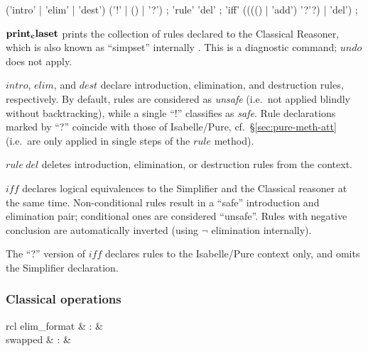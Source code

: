 \begin{rail}
  ('intro' | 'elim' | 'dest') ('!' | () | '?')
  ;
  'rule' 'del'
  ;
  'iff' (((() | 'add') '?'?) | 'del')
  ;
\end{rail}

\begin{descr}

\item [${\mathord{\mathbf{print_claset}}}$] prints the collection of rules declared to
  the Classical Reasoner, which is also known as ``simpset'' internally
  \cite{isabelle-ref}.  This is a diagnostic command; $undo$ does not apply.

\item [$intro$, $elim$, and $dest$] declare introduction, elimination, and
  destruction rules, respectively.  By default, rules are considered as
  \emph{unsafe} (i.e.\ not applied blindly without backtracking), while a
  single ``!'' classifies as \emph{safe}.  Rule declarations marked by ``?''
  coincide with those of Isabelle/Pure, cf.\ \S\ref{sec:pure-meth-att} (i.e.\
  are only applied in single steps of the $rule$ method).

\item [$rule~del$] deletes introduction, elimination, or destruction rules from
  the context.

\item [$iff$] declares logical equivalences to the Simplifier and the
  Classical reasoner at the same time.  Non-conditional rules result in a
  ``safe'' introduction and elimination pair; conditional ones are considered
  ``unsafe''.  Rules with negative conclusion are automatically inverted
  (using $\neg$ elimination internally).

  The ``?'' version of $iff$ declares rules to the Isabelle/Pure context only,
  and omits the Simplifier declaration.

\end{descr}


\subsubsection{Classical operations}


\begin{matharray}{rcl}
  elim_format & : & \isaratt \\
  swapped & : & \isaratt \\
\end{matharray}

